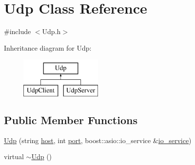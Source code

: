 \hypertarget{classUdp}{
\section{Udp Class Reference}
\label{classUdp}
}


{\ttfamily \#include $<$Udp.h$>$}

Inheritance diagram for Udp:\begin{figure}[H]
\begin{center}
\leavevmode
\includegraphics[height=2.000000cm]{classUdp}
\end{center}
\end{figure}
\subsection*{Public Member Functions}
\begin{DoxyCompactItemize}
\item 
\hyperlink{classUdp_a9a7578235269c76bf6d810b7ac1eb268}{Udp} (string \hyperlink{classUdp_a798fd48815d9d97045e8e6a3a290d301}{host}, int \hyperlink{classUdp_af69ea781b31a1fa62e5d3012b6288dc8}{port}, boost::asio::io\_\-service \&\hyperlink{classUdp_a7e143116ab3a0f478c8461ca04af782b}{io\_\-service})
\item 
virtual \hyperlink{classUdp_a74976ab6af022569ab20089c317d0cb6}{$\sim$Udp} ()
\end{DoxyCompactItemize}
